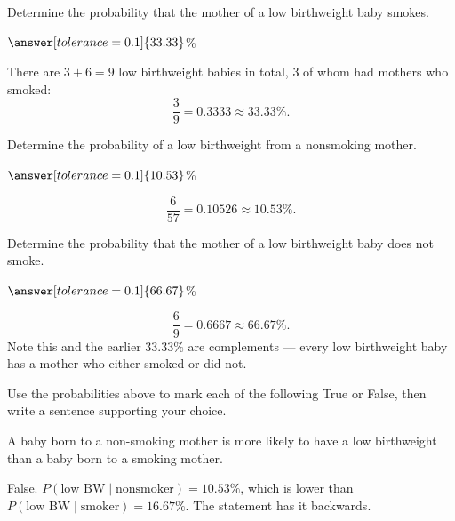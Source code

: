 \documentclass[12pt]{ximera}
\begin{document}
\begin{problem}
Determine the probability that the mother of a low birthweight baby smokes.

$\answer[tolerance=0.1]{33.33}$\%

\begin{solution}
There are $3 + 6 = 9$ low birthweight babies in total, 3 of whom had mothers who smoked:
\[
\frac{3}{9} = 0.3333 \approx 33.33\%.
\]
\end{solution}
\end{problem}

\begin{problem}
Determine the probability of a low birthweight from a nonsmoking mother.

$\answer[tolerance=0.1]{10.53}$\%

\begin{solution}
\[
\frac{6}{57} = 0.10526 \approx 10.53\%.
\]
\end{solution}
\end{problem}

\begin{problem}
Determine the probability that the mother of a low birthweight baby does not smoke.

$\answer[tolerance=0.1]{66.67}$\%

\begin{solution}
\[
\frac{6}{9} = 0.6667 \approx 66.67\%.
\]
Note this and the earlier $33.33\%$ are complements --- every low birthweight baby has a
mother who either smoked or did not.
\end{solution}
\end{problem}

Use the probabilities above to mark each of the following True or False, then write a
sentence supporting your choice.

\begin{problem}
A baby born to a non-smoking mother is more likely to have a low birthweight than a baby
born to a smoking mother.
\begin{multipleChoice}
\end{multipleChoice}

\begin{freeResponse}
\end{freeResponse}

\begin{solution}
False. $P(\text{low BW} \mid \text{nonsmoker}) = 10.53\%$, which is lower than
$P(\text{low BW} \mid \text{smoker}) = 16.67\%$. The statement has it backwards.
\end{solution}
\end{problem}
\end{document}
